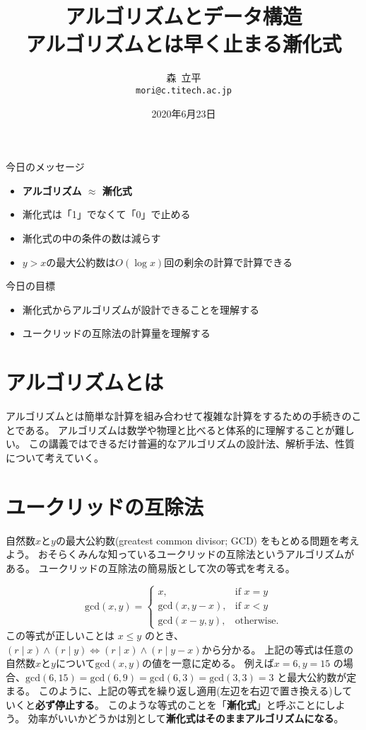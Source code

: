 \documentclass[a4paper,oneside,onecolumn,openany,article,10pt]{memoir}
\title{アルゴリズムとデータ構造\\\vspace{.5em} \Large アルゴリズムとは早く止まる漸化式}
\date{2020年6月23日}
\author{森~立平\\ \texttt{mori@c.titech.ac.jp}}
\theoremstyle{remark}
\begin{document}
\maketitle


\noindent
今日のメッセージ
\begin{itemize}
\item \textbf{アルゴリズム $\approx$ 漸化式}
\item 漸化式は「1」でなくて「0」で止める
\item 漸化式の中の条件の数は減らす
\item $y>x$の最大公約数は$O(\log x)$回の剰余の計算で計算できる
\end{itemize}

\noindent
今日の目標
\begin{itemize}
\item 漸化式からアルゴリズムが設計できることを理解する
\item ユークリッドの互除法の計算量を理解する
\end{itemize}


\section{アルゴリズムとは}
アルゴリズムとは簡単な計算を組み合わせて複雑な計算をするための手続きのことである。
アルゴリズムは数学や物理と比べると体系的に理解することが難しい。
この講義ではできるだけ普遍的なアルゴリズムの設計法、解析手法、性質について考えていく。

\section{ユークリッドの互除法}
自然数$x$と$y$の最大公約数(greatest common divisor; GCD) をもとめる問題を考えよう。
おそらくみんな知っているユークリッドの互除法というアルゴリズムがある。
ユークリッドの互除法の簡易版として次の等式を考える。

\begin{equation}
\mathrm{gcd}(x, y) =
\begin{cases}
x,& \text{if } x = y\\
\mathrm{gcd}(x, y-x),& \text{if } x < y\\
\mathrm{gcd}(x-y, y),& \text{otherwise.}
\end{cases}
\label{eq:gcd1}
\end{equation}
この等式が正しいことは $x\le y$ のとき、$(r\mid x) \land (r\mid y) \iff (r\mid x) \land (r\mid y-x)$から分かる。
上記の等式は任意の自然数$x$と$y$について$\mathrm{gcd}(x, y)$の値を一意に定める。
例えば$x=6, y=15$ の場合、$\mathrm{gcd}(6, 15) = \mathrm{gcd}(6, 9) = \mathrm{gcd}(6, 3) = \mathrm{gcd}(3, 3) = 3$ と最大公約数が定まる。
このように、上記の等式を繰り返し適用(左辺を右辺で置き換える)していくと\textbf{必ず停止する}。
このような等式のことを「\textbf{漸化式}」と呼ぶことにしよう。
効率がいいかどうかは別として\textbf{漸化式はそのままアルゴリズムになる}。
\end{document}
